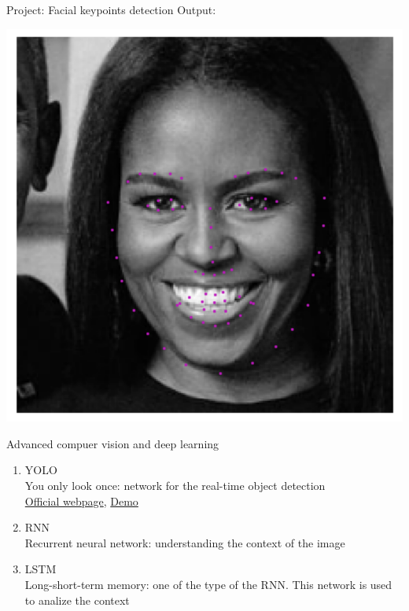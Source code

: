 \documentclass{beamer}
\begin{document}
\begin{frame}{Project: Facial keypoints detection}
Output:
\begin{center}
\includegraphics[scale=0.4]{images/michelle_detected.png}
\end{center}
\end{frame}

\begin{frame}{Advanced compuer vision and deep learning}
\begin{enumerate}
\item YOLO\\
You only look once: network for the real-time object detection\\
\href{https://pjreddie.com/darknet/yolo/}{Official webpage}, 
\href{https://www.youtube.com/watch?v=JLcLryo7lbQ}{Demo}

\item RNN\\
Recurrent neural network: understanding the context of the image 
\item LSTM\\
Long-short-term memory: one of the type of the RNN. This network is used to analize the context
\end{enumerate}
\end{frame}
\end{document}
